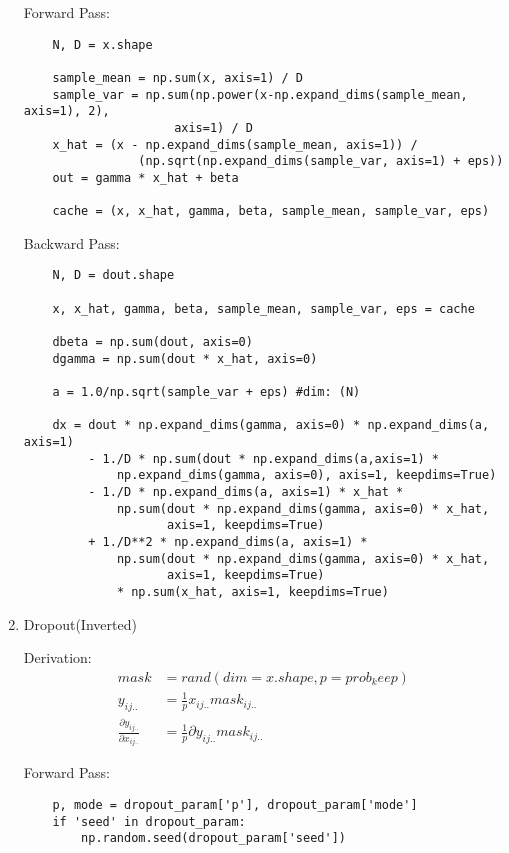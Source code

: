 \documentclass[12pt,letter]{article}
\begin{document}
\begin{enumerate}
  \pagebreak

  Forward Pass:
\begin{verbatim}
    N, D = x.shape

    sample_mean = np.sum(x, axis=1) / D
    sample_var = np.sum(np.power(x-np.expand_dims(sample_mean, axis=1), 2),
                     axis=1) / D
    x_hat = (x - np.expand_dims(sample_mean, axis=1)) / 
                (np.sqrt(np.expand_dims(sample_var, axis=1) + eps))
    out = gamma * x_hat + beta

    cache = (x, x_hat, gamma, beta, sample_mean, sample_var, eps)
\end{verbatim}
  Backward Pass:
\begin{verbatim}
    N, D = dout.shape
      
    x, x_hat, gamma, beta, sample_mean, sample_var, eps = cache

    dbeta = np.sum(dout, axis=0)
    dgamma = np.sum(dout * x_hat, axis=0)
        
    a = 1.0/np.sqrt(sample_var + eps) #dim: (N)
    
    dx = dout * np.expand_dims(gamma, axis=0) * np.expand_dims(a, axis=1)
         - 1./D * np.sum(dout * np.expand_dims(a,axis=1) * 
             np.expand_dims(gamma, axis=0), axis=1, keepdims=True)
         - 1./D * np.expand_dims(a, axis=1) * x_hat * 
             np.sum(dout * np.expand_dims(gamma, axis=0) * x_hat,
                    axis=1, keepdims=True)
         + 1./D**2 * np.expand_dims(a, axis=1) * 
             np.sum(dout * np.expand_dims(gamma, axis=0) * x_hat, 
                    axis=1, keepdims=True) 
             * np.sum(x_hat, axis=1, keepdims=True)
\end{verbatim}

  \pagebreak
  
\item Dropout(Inverted)

  Derivation:
  \begin{align*}
    mask &= rand(dim=x.shape, p=prob_keep)\\
    y_{ij..} &= \frac{1}{p} x_{ij..} mask_{ij..}\\
    \frac{\partial y_{ij..}}{\partial x_{ij..}} &= \frac{1}{p} \partial y_{ij..} mask_{ij..}
  \end{align*}

  Forward Pass:
\begin{verbatim}
    p, mode = dropout_param['p'], dropout_param['mode']
    if 'seed' in dropout_param:
        np.random.seed(dropout_param['seed'])


\end{verbatim}
\end{enumerate}
\end{document}
